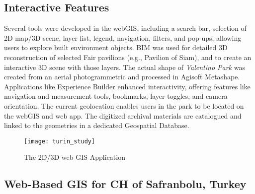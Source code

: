 \subsection*{Interactive Features}

Several tools were developed in the web\gls{GIS}, including a search bar, selection of \gls{2D} map/\gls{3D} scene, layer list, legend, navigation, filters, and pop-ups, allowing users to explore built environment objects. 
\gls{BIM} was used for detailed \gls{3D} reconstruction of selected Fair pavilions (e.g., Pavilion of Siam), and to create an interactive \gls{3D} scene with those layers. 
The actual shape of \textit{Valentino Park} was created from an aerial photogrammetric and processed in Agisoft Metashape. Applications like Experience Builder
enhanced interactivity, offering features like navigation and measurement tools, bookmarks, layer toggles, and camera orientation. The current geolocation enables users in the park to be located on the web\gls{GIS} and web app. 
The digitized archival materials are catalogued and linked to the geometries in a dedicated Geospatial Database. 
 

\begin{figure}[h!]
  \centering
  \texttt{[image: turin\_study]}
  \caption{The \gls{2D}/\gls{3D} web \gls{GIS} Application}
  \label{fig:turin_study}
\end{figure}
\FloatBarrier






\subsection{Web-Based \gls{GIS} for \gls{CH} of Safranbolu, Turkey} 
\label{sec:gis_safranbolu}

